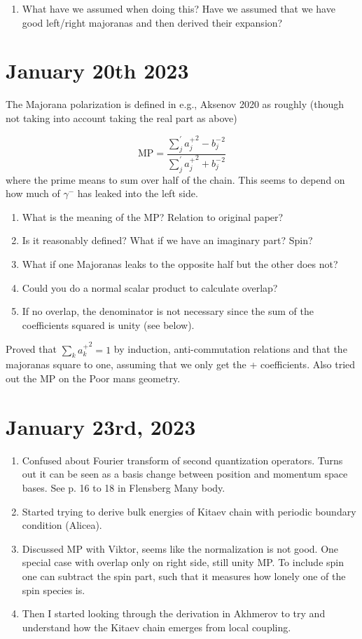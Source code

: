 \documentclass{article}
\begin{document}
\begin{enumerate}
    \item What have we assumed when doing this? Have we assumed that we have good left/right majoranas and then derived their expansion?
\end{enumerate}

\section{January 20th 2023}
The Majorana polarization is defined in e.g., Aksenov 2020 as roughly (though not taking into account taking the real part as above)

\begin{equation}
    \text{MP} = \frac{\sum_j^{'} {a_j^+}^2 - {b_j^-}^2}{\sum_j^{'} {a_j^+}^2 + {b_j^-}^2}
\end{equation}
where the prime means to sum over half of the chain. This seems to depend on how much of $\gamma^-$ has leaked into the left side. 

\begin{enumerate}
    \item What is the meaning of the MP\@? Relation to original paper?
    \item Is it reasonably defined? What if we have an imaginary part? Spin?
    \item What if one Majoranas leaks to the opposite half but the other does not?
    \item Could you do a normal scalar product to calculate overlap?
    \item If no overlap, the denominator is not necessary since the sum of the coefficients squared is unity (see below).
\end{enumerate}
Proved that $\sum_k {a_k^+}^2 = 1$ by induction, anti-commutation relations and that the majoranas square to one, assuming that we only get the + coefficients. Also tried out the MP on the Poor mans geometry.
\section{January 23rd, 2023}
\begin{enumerate}
    \item Confused about Fourier transform of second quantization operators. Turns out it can be seen as a basis change between position and momentum space bases. See p. 16 to 18 in Flensberg Many body.
    \item Started trying to derive bulk energies of Kitaev chain with periodic boundary condition (Alicea).
    \item Discussed MP with Viktor, seems like the normalization is not good. One special case with overlap only on right side, still unity MP\@. To include spin one can subtract the spin part, such that it measures how lonely one of the spin species is. 
    \item Then I started looking through the derivation in Akhmerov to try and understand how the Kitaev chain emerges from local coupling.
\end{enumerate}
\end{document}
